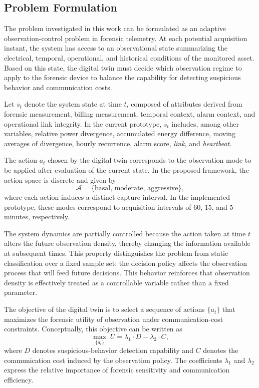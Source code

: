 \documentclass[journal]{IEEEtran}
\begin{document}
\subsection{Problem Formulation} \label{subsec:problem_formulation}
The problem investigated in this work can be formulated as an adaptive observation-control problem in forensic telemetry. At each potential acquisition instant, the system has access to an observational state summarizing the electrical, temporal, operational, and historical conditions of the monitored asset. Based on this state, the digital twin must decide which observation regime to apply to the forensic device to balance the capability for detecting suspicious behavior and communication costs.

Let $s_t$ denote the system state at time $t$, composed of attributes derived from forensic measurement, billing measurement, temporal context, alarm context, and operational link integrity. In the current prototype, $s_t$ includes, among other variables, relative power divergence, accumulated energy difference, moving averages of divergence, hourly recurrence, alarm score, \textit{link}, and \textit{heartbeat}.

The action $a_t$ chosen by the digital twin corresponds to the observation mode to be applied after evaluation of the current state. In the proposed framework, the action space is discrete and given by
\[
\mathcal{A} = \{\text{basal},\, \text{moderate},\, \text{aggressive}\},
\]
where each action induces a distinct capture interval. In the implemented prototype, these modes correspond to acquisition intervals of 60, 15, and 5 minutes, respectively.

The system dynamics are partially controlled because the action taken at time $t$ alters the future observation density, thereby changing the information available at subsequent times. This property distinguishes the problem from static classification over a fixed sample set: the decision policy affects the observation process that will feed future decisions. This behavior reinforces that observation density is effectively treated as a controllable variable rather than a fixed parameter.

The objective of the digital twin is to select a sequence of actions $\{a_t\}$ that maximizes the forensic utility of observation under communication-cost constraints. Conceptually, this objective can be written as
\[
\max_{\{a_t\}} \; U = \lambda_1 \cdot D - \lambda_2 \cdot C,
\]
where $D$ denotes suspicious-behavior detection capability and $C$ denotes the communication cost induced by the observation policy. The coefficients $\lambda_1$ and $\lambda_2$ express the relative importance of forensic sensitivity and communication efficiency.
\end{document}
